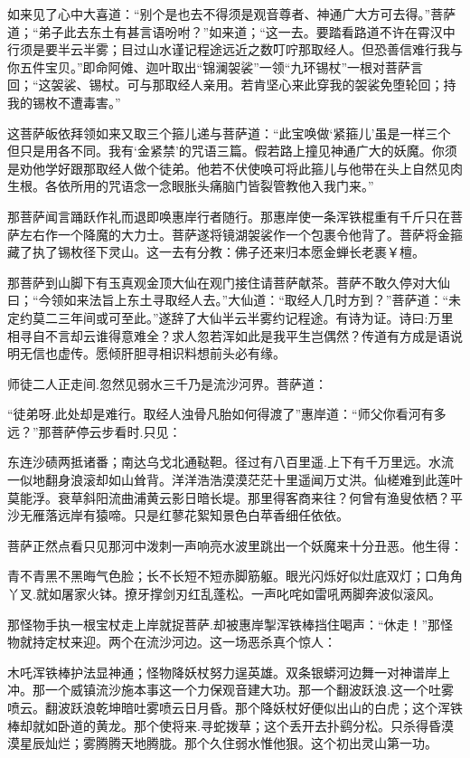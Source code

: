 \documentclass[12pt,UTF8]{ctexbook}
\begin{document}
{如来见了心中大喜道：“别个是也去不得须是观音尊者、神通广大方可去得。”菩萨道；“弟子此去东土有甚言语吩咐？”如来道；“这一去。要踏看路道不许在霄汉中行须是要半云半雾；目过山水谨记程途远近之数叮咛那取经人。但恐善信难行我与你五件宝贝。”即命阿傩、迦叶取出“锦澜袈裟”一领“九环锡杖”一根对菩萨言回；“这袈裟、锡杖。可与那取经人亲用。若肯坚心来此穿我的袈裟免堕轮回；持我的锡枚不遭毒害。”

这菩萨皈依拜领如来又取三个箍儿递与菩萨道：“此宝唤做‘紧箍儿’虽是一样三个但只是用各不同。我有‘金紧禁’的咒语三篇。假若路上撞见神通广大的妖魔。你须是劝他学好跟那取经人做个徒弟。他若不伏使唤可将此箍儿与他带在头上自然见肉生根。各依所用的咒语念一念眼胀头痛脑门皆裂管教他入我门来。”

那菩萨闻言踊跃作礼而退即唤惠岸行者随行。那惠岸使一条浑铁棍重有千斤只在菩萨左右作一个降魔的大力士。菩萨遂将镜湖袈裟作一个包裹令他背了。菩萨将金箍藏了执了锡枚径下灵山。这一去有分教：佛子还来归本愿金蝉长老裹￥檀。

那菩萨到山脚下有玉真观金顶大仙在观门接住请菩萨献茶。菩萨不敢久停对大仙曰；“今领如来法旨上东土寻取经人去。”大仙道：“取经人几时方到？”菩萨道：“未定约莫二三年间或可至此。”遂辞了大仙半云半雾约记程途。有诗为证。诗曰:万里相寻自不言却云谁得意难全？求人忽若浑如此是我平生岂偶然？传道有方成是语说明无信也虚传。愿倾肝胆寻相识料想前头必有缘。

师徒二人正走间.忽然见弱水三千乃是流沙河界。菩萨道：

“徒弟呀.此处却是难行。取经人浊骨凡胎如何得渡了”惠岸道：“师父你看河有多远？”那菩萨停云步看时.只见：

东连沙碛两抵诸番；南达乌戈北通鞑靼。径过有八百里遥.上下有千万里远。水流一似地翻身浪滚却如山耸背。洋洋浩浩漠漠茫茫十里遥闻万丈洪。仙槎难到此莲叶莫能浮。衰草斜阳流曲浦黄云影日暗长堤。那里得客商来往？何曾有渔叟依栖？平沙无雁落远岸有猿啼。只是红蓼花絮知景色白苹香细任依依。

菩萨正然点看只见那河中泼刺一声响亮水波里跳出一个妖魔来十分丑恶。他生得：

青不青黑不黑晦气色脸；长不长短不短赤脚筋躯。眼光闪烁好似灶底双灯；口角角丫叉.就如屠家火钵。撩牙撑剑刃红乱蓬松。一声叱咤如雷吼两脚奔波似滚风。

那怪物手执一根宝杖走上岸就捉菩萨.却被惠岸掣浑铁棒挡住喝声：“休走！”那怪物就持定杖来迎。两个在流沙河边。这一场恶杀真个惊人：

木吒浑铁棒护法显神通；怪物降妖杖努力逞英雄。双条银蟒河边舞一对神谱岸上冲。那一个威镇流沙施本事这一个力保观音建大功。那一个翻波跃浪.这一个吐雾喷云。翻波跃浪乾坤暗吐雾喷云日月昏。那个降妖杖好便似出山的白虎；这个浑铁棒却就如卧道的黄龙。那个使将来.寻蛇拨草；这个丢开去扑鹞分松。只杀得昏漠漠星辰灿烂；雾腾腾天地腾胧。那个久住弱水惟他狠。这个初出灵山第一功。

}
\end{document}
